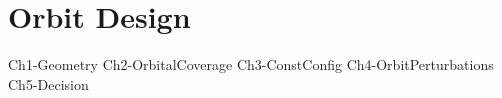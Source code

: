 % 
%





\setlength{\parindent}{0pt}

\usepackage{epigraph}
\usepackage{tocloft}
\usepackage{pdflscape}




\newpage\thispagestyle{EmptyPage}
\mbox{}\newpage


\setcounter{tocdepth}{3}
\tableofcontents
\pagebreak

\renewcommand{\cfttabnumwidth}{4em}
\listoftables
\pagebreak

\renewcommand{\cftfignumwidth}{4em}
\listoffigures



\newpage
{}

\newpage
\setlength{\parskip}{1em}


\part{Orbit Design}
{Ch1-Geometry}
{Ch2-OrbitalCoverage}
{Ch3-ConstConfig}
{Ch4-OrbitPerturbations}
{Ch5-Decision}

